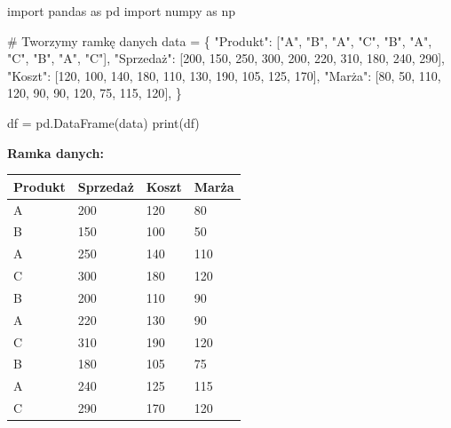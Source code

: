 \documentclass[
  polish,
  letterpaper,
  DIV=11,
  numbers=noendperiod]{scrreprt}
\newenvironment{Shaded}{\begin{snugshade}}{\end{snugshade}}
\newcommand{\BuiltInTok}[1]{\textcolor[rgb]{0.00,0.23,0.31}{#1}}
\newcommand{\CommentTok}[1]{\textcolor[rgb]{0.37,0.37,0.37}{#1}}
\newcommand{\DecValTok}[1]{\textcolor[rgb]{0.68,0.00,0.00}{#1}}
\newcommand{\ImportTok}[1]{\textcolor[rgb]{0.00,0.46,0.62}{#1}}
\newcommand{\NormalTok}[1]{\textcolor[rgb]{0.00,0.23,0.31}{#1}}
\newcommand{\OperatorTok}[1]{\textcolor[rgb]{0.37,0.37,0.37}{#1}}
\newcommand{\StringTok}[1]{\textcolor[rgb]{0.13,0.47,0.30}{#1}}
\begin{document}
\begin{Shaded}
\begin{Highlighting}[]
\ImportTok{import}\NormalTok{ pandas }\ImportTok{as}\NormalTok{ pd}
\ImportTok{import}\NormalTok{ numpy }\ImportTok{as}\NormalTok{ np}

\CommentTok{\# Tworzymy ramkę danych}
\NormalTok{data }\OperatorTok{=}\NormalTok{ \{}
    \StringTok{"Produkt"}\NormalTok{: [}\StringTok{"A"}\NormalTok{, }\StringTok{"B"}\NormalTok{, }\StringTok{"A"}\NormalTok{, }\StringTok{"C"}\NormalTok{, }\StringTok{"B"}\NormalTok{, }\StringTok{"A"}\NormalTok{, }\StringTok{"C"}\NormalTok{, }\StringTok{"B"}\NormalTok{, }\StringTok{"A"}\NormalTok{, }\StringTok{"C"}\NormalTok{],}
    \StringTok{"Sprzedaż"}\NormalTok{: [}\DecValTok{200}\NormalTok{, }\DecValTok{150}\NormalTok{, }\DecValTok{250}\NormalTok{, }\DecValTok{300}\NormalTok{, }\DecValTok{200}\NormalTok{, }\DecValTok{220}\NormalTok{, }\DecValTok{310}\NormalTok{, }\DecValTok{180}\NormalTok{, }\DecValTok{240}\NormalTok{, }\DecValTok{290}\NormalTok{],}
    \StringTok{"Koszt"}\NormalTok{: [}\DecValTok{120}\NormalTok{, }\DecValTok{100}\NormalTok{, }\DecValTok{140}\NormalTok{, }\DecValTok{180}\NormalTok{, }\DecValTok{110}\NormalTok{, }\DecValTok{130}\NormalTok{, }\DecValTok{190}\NormalTok{, }\DecValTok{105}\NormalTok{, }\DecValTok{125}\NormalTok{, }\DecValTok{170}\NormalTok{],}
    \StringTok{"Marża"}\NormalTok{: [}\DecValTok{80}\NormalTok{, }\DecValTok{50}\NormalTok{, }\DecValTok{110}\NormalTok{, }\DecValTok{120}\NormalTok{, }\DecValTok{90}\NormalTok{, }\DecValTok{90}\NormalTok{, }\DecValTok{120}\NormalTok{, }\DecValTok{75}\NormalTok{, }\DecValTok{115}\NormalTok{, }\DecValTok{120}\NormalTok{],}
\NormalTok{\}}

\NormalTok{df }\OperatorTok{=}\NormalTok{ pd.DataFrame(data)}
\BuiltInTok{print}\NormalTok{(df)}
\end{Highlighting}
\end{Shaded}

\textbf{Ramka danych:}

\begin{longtable}[]{@{}llll@{}}
\toprule\noalign{}
Produkt & Sprzedaż & Koszt & Marża \\
\midrule\noalign{}
\endhead
\bottomrule\noalign{}
\endlastfoot
A & 200 & 120 & 80 \\
B & 150 & 100 & 50 \\
A & 250 & 140 & 110 \\
C & 300 & 180 & 120 \\
B & 200 & 110 & 90 \\
A & 220 & 130 & 90 \\
C & 310 & 190 & 120 \\
B & 180 & 105 & 75 \\
A & 240 & 125 & 115 \\
C & 290 & 170 & 120 \\
\end{longtable}
\end{document}
